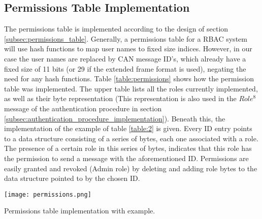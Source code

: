 \subsection{Permissions Table Implementation}
\label{subsec:permissions_table_implementation}

The permissions table is implemented according to the design of section \ref{subsec:permissions_table}. Generally, a permissions table for a RBAC system will use hash functions to map user names to fixed size indices. However, in our case the user names are replaced by CAN message ID's, which already have a fixed size of 11 bits (or 29 if the extended frame format is used), negating the need for any hash functions. Table \ref{table:permissions} shows how the permission table was implemented. The upper table lists all the roles currently implemented, as well as their byte representation (This representation is also used in the $Role^{8}$ message of the authentication procedure in section \ref{subsec:authentication_procedure_implementation}). Beneath this, the implementation of the example of table \ref{table:2} is given. Every ID entry points to a data structure consisting of a series of bytes, each one associated with a role. The presence of a certain role in this series of bytes, indicates that this role has the permission to send a message with the aforementioned ID. Permissions are easily granted and revoked (Admin role) by deleting and adding role bytes to the data structure pointed to by the chosen ID. 

\begin{table}[h]
	\label{table:permissions}
	\centering
	\texttt{[image: permissions.png]}
	\caption{Permissions table implementation with example.}
\end{table}